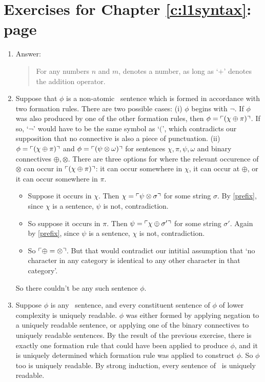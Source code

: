 {\section*{Exercises for Chapter \ref{c:l1syntax}: page \pageref{ex:l1syntax}} \label{ans:l1syntax}

\begin{enumerate}
	\item Answer: \begin{quote}
		For any numbers $n$ and $m$,  denotes a number, as long as `$+$' denotes the addition operator.
	\end{quote} \setcounter{enumi}{2}
	\item Suppose that $\phi$ is a non-atomic \lone\ sentence which is formed in accordance with two formation rules. There are two possible cases: (i) $\phi$ begins with $\neg$. If $\phi$ was also produced by one of the other formation rules, then $\phi = \ulcorner (\chi\oplus\pi) \urcorner$. If so, `$\neg$' would have to be the same symbol as `$($', which contradicts our supposition that no connective is also a piece of punctuation. (ii) $\phi = \ulcorner (\chi\oplus\pi) \urcorner$  and $\phi = \ulcorner (\psi\otimes\omega) \urcorner$ for sentences $\chi,\pi,\psi,\omega$ and binary connectives $\oplus,\otimes$. There are three options for where the relevant occurence of $\otimes$ can occur in $\ulcorner (\chi\oplus\pi) \urcorner$: it can occur somewhere in $\chi$, it can occur at $\oplus$, or it can occur somewhere in $\pi$. \begin{itemize}
		\item Suppose it occurs in $\chi$. Then $\chi = \ulcorner \psi\otimes\sigma \urcorner$ for some string $\sigma$. By \autoref{prefix}, since $\chi$ is a sentence, $\psi$ is not, contradiction. 

\item So suppose it occurs in $\pi$. Then $\psi = \ulcorner \chi\oplus\sigma' \urcorner$ for some string $\sigma'$. Again by \autoref{prefix}, since $\psi$ is a sentence, $\chi$ is not, contradiction.
\item So $\ulcorner \oplus=\otimes \urcorner$. But that would contradict our intitial assumption that `no character in any category is identical to any other character in that category'. 
	\end{itemize}
So there couldn't be any such sentence $\phi$.
\item Suppose $\phi$ is any \lone\ sentence, and every constituent sentence of $\phi$ of lower complexity is uniquely readable. $\phi$ was either formed by applying negation to a uniquely readable sentence, or applying one of the binary connectives to uniquely readable sentences. By the result of the previous exercise, there is exactly one formation rule that could have been applied to produce $\phi$, and it is uniquely determined which formation rule was applied to construct $\phi$. So $\phi$ too is uniquely readable.  By strong induction, every sentence of \lone\ is uniquely readable.
		

\end{enumerate}}
